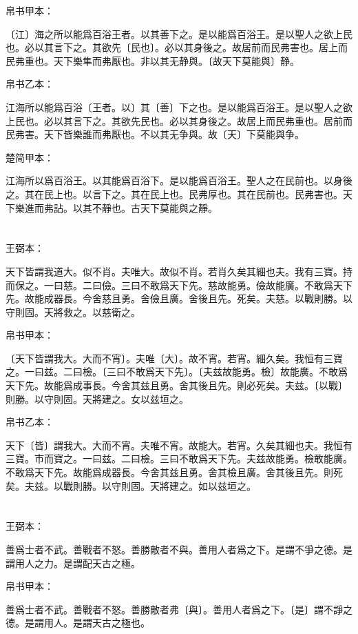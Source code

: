 \documentclass[a5paper]{ctexbook}
\begin{document}
    
    帛书甲本：

    〔江〕海之所以能爲百浴王者。以其善下之。是以能爲百浴王。是以聖人之欲上民也。必以其言下之。其欲先〔民也〕。必以其身後之。故居前而民弗害也。居上而民弗重也。天下樂隼而弗厭也。非以其无静與。〔故天下莫能與〕静。

    帛书乙本：

    江海所以能爲百浴〔王者。以〕其〔善〕下之也。是以能爲百浴王。是以聖人之欲上民也。必以其言下之。其欲先民也。必以其身後之。故居上而民弗重也。居前而民弗害。天下皆樂誰而弗厭也。不以其无争與。故〔天〕下莫能與争。

    楚简甲本：

    江海所以爲百浴王。以其能爲百浴下。是以能爲百浴王。聖人之在民前也。以身後之。其在民上也。以言下之。其在民上也。民弗厚也。其在民前也。民弗害也。天下樂進而弗詀。以其不靜也。古天下莫能與之靜。

    \chapter{}
    王弼本：

    天下皆謂我道大。似不肖。夫唯大。故似不肖。若肖久矣其細也夫。我有三寶。持而保之。一曰慈。二曰儉。三曰不敢爲天下先。慈故能勇。儉故能廣。不敢爲天下先。故能成器長。今舍慈且勇。舍儉且廣。舍後且先。死矣。夫慈。以戰則勝。以守則固。天將救之。以慈衛之。

    
    帛书甲本：

    〔天下皆謂我大。大而不宵〕。夫唯〔大〕。故不宵。若宵。細久矣。我恒有三寶之。一曰兹。二曰檢。〔三曰不敢爲天下先〕。〔夫兹故能勇。檢〕故能廣。不敢爲天下先。故能爲成事長。今舍其兹且勇。舍其後且先。則必死矣。夫兹。〔以戰〕則勝。以守則固。天將建之。女以兹垣之。

    帛书乙本：

    天下〔皆〕謂我大。大而不宵。夫唯不宵。故能大。若宵。久矣其細也夫。我恒有三寶。市而寶之。一曰兹。二曰檢。三曰不敢爲天下先。夫兹故能勇。檢敢能廣。不敢爲天下先。故能爲成器長。今舍其兹且勇。舍其檢且廣。舍其後且先。則死矣。夫兹。以戰則勝。以守則固。天將建之。如以兹垣之。

    \chapter{}
    王弼本：

    善爲士者不武。善戰者不怒。善勝敵者不與。善用人者爲之下。是謂不爭之德。是謂用人之力。是謂配天古之極。

    
    帛书甲本：

    善爲士者不武。善戰者不怒。善勝敵者弗〔與〕。善用人者爲之下。〔是〕謂不諍之德。是謂用人。是謂天古之極也。
\end{document}
